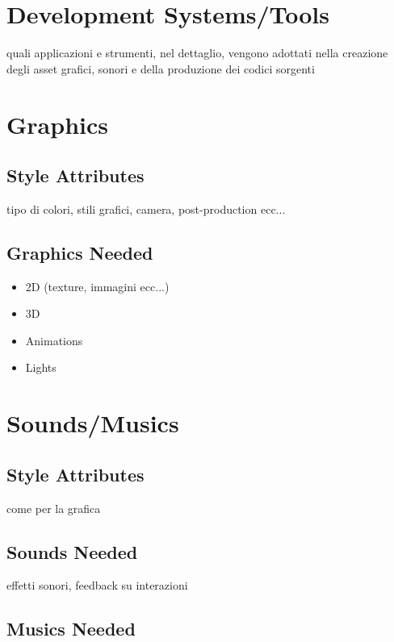 \documentclass[a4paper]{scrreprt}
\begin{document}
\chapter{Development Systems/Tools}
quali applicazioni e strumenti, nel dettaglio, vengono adottati nella creazione degli asset grafici, sonori e della produzione dei codici sorgenti


\chapter{Graphics}

\section{Style Attributes}
tipo di colori, stili grafici, camera, post-production ecc...

\section{Graphics Needed}

\begin{itemize}
\item 2D (texture, immagini ecc...)
\item 3D
\item Animations
\item Lights
\end{itemize}


\chapter{Sounds/Musics}

\section{Style Attributes}
come per la grafica

\section{Sounds Needed}
effetti sonori, feedback su interazioni

\section{Musics Needed}
\end{document}
